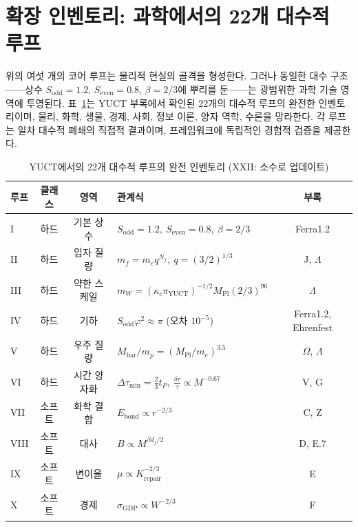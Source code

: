 \documentclass[12pt,a4paper]{article}
\begin{document}
	\section*{확장 인벤토리: 과학에서의 22개 대수적 루프}
	
	위의 여섯 개의 코어 루프는 물리적 현실의 골격을 형성한다. 그러나 동일한 대수 구조——상수 \(S_{\mathrm{odd}} = 1.2\), \(S_{\mathrm{even}} = 0.8\), \(\beta = 2/3\)에 뿌리를 둔——는 광범위한 과학 기술 영역에 투영된다. 표~\ref{tab:all-loops-22}는 YUCT 부록에서 확인된 22개의 대수적 루프의 완전한 인벤토리이며, 물리, 화학, 생물, 경제, 사회, 정보 이론, 양자 역학, 수론을 망라한다. 각 루프는 일차 대수적 폐쇄의 직접적 결과이며, 프레임워크에 독립적인 경험적 검증을 제공한다.
	
	\begin{table}[htbp]
		\centering
		\footnotesize
		\setlength{\tabcolsep}{2.5pt}
		\caption{YUCT에서의 22개 대수적 루프의 완전 인벤토리 (XXII: 소수로 업데이트)}
		\label{tab:all-loops-22}
		\begin{tabular}{l c c p{3.8cm} c}
			\toprule
			\textbf{루프} & \textbf{클래스} & \textbf{영역} & \textbf{관계식} & \textbf{부록} \\
			\midrule
			I   & 하드 & 기본 상수 & \(S_{\mathrm{odd}}=1.2,\ S_{\mathrm{even}}=0.8,\ \beta=2/3\) & Ferra1.2 \\
			II  & 하드 & 입자 질량 & \(m_f = m_e q^{N_f},\ q=(3/2)^{1/3}\) & J, \(\Lambda\) \\
			III & 하드 & 약한 스케일 & \(m_W = (\kappa_c \pi_{\mathrm{YUCT}})^{-1/2} M_{\mathrm{Pl}} (2/3)^{96}\) & \(\Lambda\) \\
			IV  & 하드 & 기하 & \(S_{\mathrm{odd}}\varphi^2 \approx \pi\) (오차 \(10^{-5}\)) & Ferra1.2, Ehrenfest \\
			V   & 하드 & 우주 질량 & \(M_{\mathrm{bar}}/m_p = (M_{\mathrm{Pl}}/m_e)^{3.5}\) & \(\Omega\), \(\Lambda\) \\
			VI  & 하드 & 시간 양자화 & \(\Delta\tau_{\min} = \frac{2}{3}t_P,\ \frac{\delta\tau}{\tau} \propto M^{-0.67}\) & V, G \\
			VII & 소프트 & 화학 결합 & \(E_{\mathrm{bond}} \propto r^{-2/3}\) & C, Z \\
			VIII& 소프트 & 대사 & \(B \propto M^{\beta d_f/2}\) & D, E.7 \\
			IX  & 소프트 & 변이율 & \(\mu \propto K_{\mathrm{repair}}^{-2/3}\) & E \\
			X   & 소프트 & 경제 & \(\sigma_{\mathrm{GDP}} \propto W^{-2/3}\) & F \\

\end{tabular}
\end{table}
\end{document}
